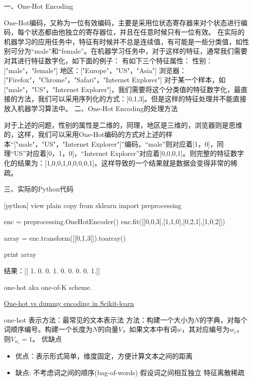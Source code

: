 \documentclass[10pt,a4paper]{ctexbook}
\begin{document}
一、One-Hot Encoding

    One-Hot编码，又称为一位有效编码，主要是采用位状态寄存器来对个状态进行编码，每个状态都由他独立的寄存器位，并且在任意时候只有一位有效。
    在实际的机器学习的应用任务中，特征有时候并不总是连续值，有可能是一些分类值，如性别可分为“male”和“female”。在机器学习任务中，对于这样的特征，通常我们需要对其进行特征数字化，如下面的例子：
有如下三个特征属性：
性别：["male"，"female"]
地区：["Europe"，"US"，"Asia"]
浏览器：["Firefox"，"Chrome"，"Safari"，"Internet Explorer"]
对于某一个样本，如["male"，"US"，"Internet Explorer"]，我们需要将这个分类值的特征数字化，最直接的方法，我们可以采用序列化的方式：[0,1,3]。但是这样的特征处理并不能直接放入机器学习算法中。
二、One-Hot Encoding的处理方法

    对于上述的问题，性别的属性是二维的，同理，地区是三维的，浏览器则是思维的，这样，我们可以采用One-Hot编码的方式对上述的样本“["male"，"US"，"Internet Explorer"]”编码，“male”则对应着[1，0]，同理“US”对应着[0，1，0]，“Internet Explorer”对应着[0,0,0,1]。则完整的特征数字化的结果为：[1,0,0,1,0,0,0,0,1]。这样导致的一个结果就是数据会变得非常的稀疏。

三、实际的Python代码

[python] view plain copy
from sklearn import preprocessing  
  
enc = preprocessing.OneHotEncoder()  
enc.fit([[0,0,3],[1,1,0],[0,2,1],[1,0,2]])  
  
array = enc.transform([[0,1,3]]).toarray()  
  
print array  

结果：[[ 1.  0.  0.  1.  0.  0.  0.  0.  1.]]



one-hot aka one-of-K scheme.


\href{https://stats.stackexchange.com/questions/224051/one-hot-vs-dummy-encoding-in-scikit-learn}{One-hot vs dummy encoding in Scikit-learn}




one-hot 表示方法：最常见的文本表示法
方法：构建一个大小为$N$的字典，对每个词顺序编号。构建一个长度为$N$的向量$V$，如果文本中有词$w$，其对应编号为$w_{i}$，则$V_{w_{i}}=1$。
优缺点
\begin{itemize}
\item 优点：表示形式简单，维度固定，方便计算文本之间的距离
\item 缺点:  
\subitem 不考虑词之间的顺序(bag-of-words)
\subitem 假设词之间相互独立
\subitem 特征离散稀疏
\end{itemize}
\end{document}
